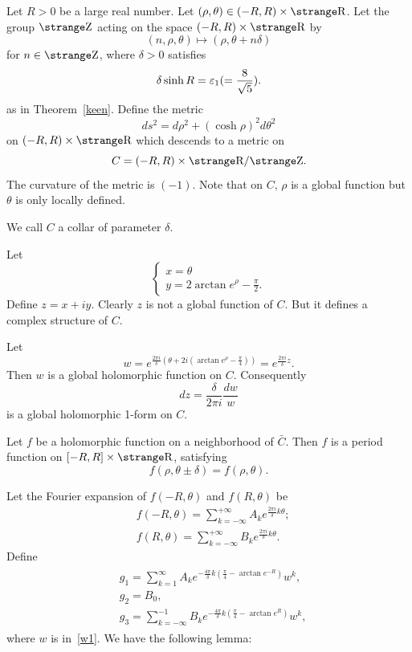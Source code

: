 Let $R>0$ be a large real number. Let $(\rho, \theta)
\in (-R,R)\times\R$.
Let the group $\Z$ acting on the space $(-R,R)\times\R$ by
\[
(n,\rho,\theta)\mapsto(\rho,\theta+n\delta)
\]
for $n\in\Z$,
where $\delta>0$ satisfies
\[
\delta\sinh R=\varepsilon_1(=\frac{8}{\sqrt{5}}).
\]
as in Theorem~\ref{keen}.
Define the metric 
\[
ds^2=d\rho^2+(\cosh\rho)^2 d\theta^2
\]
on $(-R,R)\times\R$ which descends to a metric on 
\[
C=(-R,R)\times\R/\Z.
\]
The curvature of the metric is $(-1)$. Note that on $C$, $\rho$ is a
global function but $\theta$ is only locally defined.

We call $C$  a collar
of parameter $\delta$.


Let
\begin{equation}\label{z1}
\left\{
\begin{array}{l}
x=\theta\\
y=2\arctan e^\rho-\frac\pi 2.
\end{array}
\right.
\end{equation}
Define $z=x+iy$. Clearly $z$ is not a global function of $C$. But it 
defines a complex structure of $C$.

Let 
\begin{equation}\label{w1}
w=e^{\frac{2\pi i}{\delta}(\theta+2i(\arctan e^\rho-\frac\pi 4))}
=e^{\frac{2\pi i}{\delta}z}.
\end{equation}
Then $w$ is a global holomorphic function on $C$. Consequently
\begin{equation}\label{dz}
dz=\frac{\delta}{2\pi i}\frac{dw}{w}
\end{equation}
is a global holomorphic 1-form on $C$.

Let $f$ be a holomorphic function on 
a neighborhood of
$\bar C$. Then $f$ is a period
function on $[-R,R]\times\R$, satisfying
\[
f(\rho,\theta\pm\delta)=f(\rho,\theta).
\]

Let the Fourier expansion of $f(-R,\theta)$ and $f(R,\theta)$ be
\begin{align*}
& f(-R,\theta)=\sum_{k=-\infty}^{+\infty} A_ke^{\frac{2\pi
i}{\delta}k\theta};\\
&f(R,\theta)=\sum_{k=-\infty}^{+\infty}B_k
e^{\frac{2\pi i}{\delta}k\theta}.
\end{align*}
Define
\begin{align}\label{g}
\begin{split}
&g_1=\sum_{k=1}^\infty A_ke^{-\frac{4\pi}{\delta}k(\frac{\pi}{4}-\arctan
e^{-R})}w^k,\\
& g_2=B_0,\\
&g_3=\sum_{k=-\infty}^{-1}B_k e^{-\frac{4\pi}{\delta}k(\frac\pi 4-
\arctan e^R)} w^k,
\end{split}
\end{align}
where $w$ is in~\eqref{w1}.
We have the following lemma:

